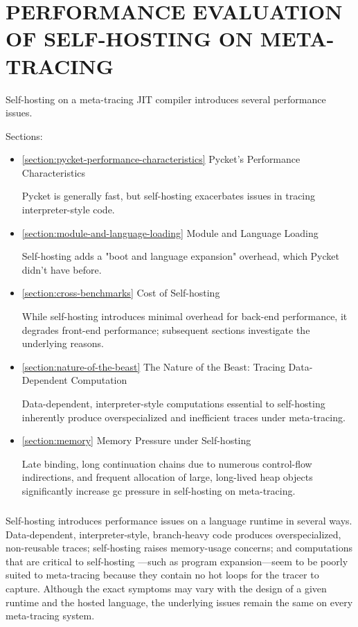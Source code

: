 \chapter[\texorpdfstring{PERFORMANCE EVALUATION OF SELF-HOSTING ON META-TRACING}
                          {6. Performance Evaluation}]{PERFORMANCE EVALUATION OF SELF-HOSTING ON META-TRACING}

	\label{chapter:problem}

	\begin{chaptersynopsis}
		\footnotesize
		Self-hosting on a meta-tracing JIT compiler introduces several performance issues.

		Sections:
		\begin{itemize}
			\item \ref{section:pycket-performance-characteristics} Pycket's Performance Characteristics

				Pycket is generally fast, but self-hosting exacerbates issues in tracing interpreter-style code.
			\item \ref{section:module-and-language-loading} Module and Language Loading

				Self-hosting adds a "boot and language expansion" overhead, which Pycket didn't have before.
			\item \ref{section:cross-benchmarks} Cost of Self-hosting

				While self-hosting introduces minimal overhead for back-end performance, it degrades front-end performance; subsequent sections investigate the underlying reasons.
			\item \ref{section:nature-of-the-beast} The Nature of the Beast: Tracing Data-Dependent Computation

				Data-dependent, interpreter-style computations essential to self-hosting inherently produce overspecialized and inefficient traces under meta-tracing.
			\item \ref{section:memory} Memory Pressure under Self-hosting

				Late binding, long continuation chains due to numerous control-flow indirections, and frequent allocation of large, long-lived heap objects significantly increase \gls{gc} pressure in self-hosting on meta-tracing.
		\end{itemize}
	\end{chaptersynopsis}

	\paragraph{}%
	 	Self-hosting introduces performance issues on a language runtime in several ways. Data-dependent, interpreter-style, branch-heavy code produces overspecialized, non-reusable traces; self-hosting raises memory-usage concerns; and computations that are critical to self-hosting —such as program expansion—seem to be poorly suited to meta-tracing because they contain no hot loops for the tracer to capture. Although the exact symptoms may vary with the design of a given runtime and the hosted language, the underlying issues remain the same on every meta-tracing system.

